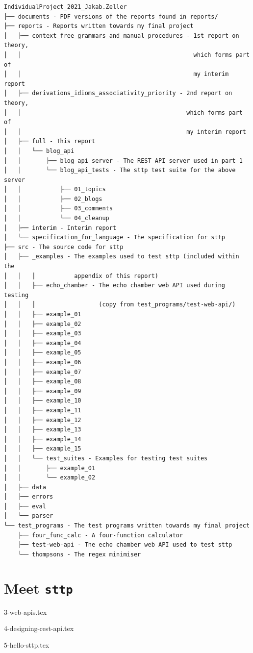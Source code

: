 \documentclass[]{full}
\theoremstyle{definition}
\begin{document}
\begin{verbatim}
IndividualProject_2021_Jakab.Zeller
├── documents - PDF versions of the reports found in reports/
├── reports - Reports written towards my final project
│   ├── context_free_grammars_and_manual_procedures - 1st report on theory,
│   │                                                 which forms part of
│   │                                                 my interim report
│   ├── derivations_idioms_associativity_priority - 2nd report on theory,
│   │                                               which forms part of
│   │                                               my interim report
│   ├── full - This report
│   │   └── blog_api
│   │       ├── blog_api_server - The REST API server used in part 1
│   │       └── blog_api_tests - The sttp test suite for the above server
│   │           ├── 01_topics
│   │           ├── 02_blogs
│   │           ├── 03_comments
│   │           └── 04_cleanup
│   ├── interim - Interim report
│   └── specification_for_language - The specification for sttp
├── src - The source code for sttp
│   ├── _examples - The examples used to test sttp (included within the
│   │   │           appendix of this report)
│   │   ├── echo_chamber - The echo chamber web API used during testing
│   │   │                  (copy from test_programs/test-web-api/)
│   │   ├── example_01
│   │   ├── example_02
│   │   ├── example_03
│   │   ├── example_04
│   │   ├── example_05
│   │   ├── example_06
│   │   ├── example_07
│   │   ├── example_08
│   │   ├── example_09
│   │   ├── example_10
│   │   ├── example_11
│   │   ├── example_12
│   │   ├── example_13
│   │   ├── example_14
│   │   ├── example_15
│   │   └── test_suites - Examples for testing test suites
│   │       ├── example_01
│   │       └── example_02
│   ├── data
│   ├── errors
│   ├── eval
│   └── parser
└── test_programs - The test programs written towards my final project
    ├── four_func_calc - A four-function calculator
    ├── test-web-api - The echo chamber web API used to test sttp
    └── thompsons - The regex minimiser
\end{verbatim}

\cprotect\part{Meet \verb|sttp|}

{3-web-apis.tex}

{4-designing-rest-api.tex}

{5-hello-sttp.tex}
\end{document}
